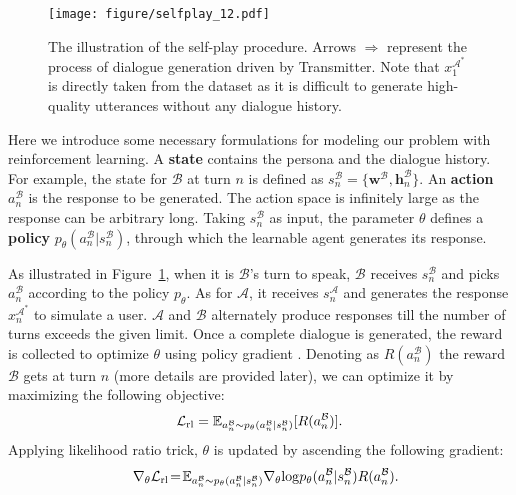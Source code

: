 \documentclass[11pt,a4paper]{article}
\begin{document}
\begin{figure}
    \centering
    \texttt{[image: figure/selfplay\_12.pdf]}
    \caption{The illustration of the self-play procedure. Arrows $\Rightarrow$ represent the process of dialogue generation driven by Transmitter. Note that $x_1^{\mathcal{A}^*}$ is directly taken from the dataset as it is difficult to generate high-quality utterances without any dialogue history.}
    \label{fig:self_play}
\end{figure}

Here we introduce some necessary formulations for modeling our problem with reinforcement learning. 
A \textbf{state} contains the persona and the dialogue history. For example, the state for $\mathcal{B}$ at turn $n$ is defined as $s^{\mathcal{B}}_n=\{\mathbf{w}^{\mathcal{B}},\mathbf{h}^{\mathcal{B}}_n\}$. 
An \textbf{action} $a^\mathcal{B}_n$ is the response to be generated. The action space is infinitely large as the response can be arbitrary long. Taking $s^\mathcal{B}_n$ as input, the parameter $\theta$ defines a \textbf{policy} $p_{\theta}(a^\mathcal{B}_n|s^\mathcal{B}_n)$, through which the learnable agent generates its response.

As illustrated in Figure~\ref{fig:self_play}, when it is $\mathcal{B}$'s turn to speak, $\mathcal{B}$ receives $s^{\mathcal{B}}_n$ and picks $a^\mathcal{B}_n$ according to the policy $p_{\theta}$. As for $\mathcal{A}$, it receives $s^{\mathcal{A}}_n$ and generates the response $x^{\mathcal{A}^*}_{n}$ to simulate a user.
$\mathcal{A}$ and $\mathcal{B}$ alternately produce responses till the number of turns exceeds the given limit. Once a complete dialogue is generated, the reward is collected to optimize $\theta$ using policy gradient \cite{sutton2000policy}. Denoting as $R(a^\mathcal{B}_n)$ the reward $\mathcal{B}$ gets at turn $n$ (more details are provided later), we can optimize it by maximizing the following objective:
\begin{equation}\label{eq:l_rl}
    \mathcal{L}_{\rm{rl}} = \mathbb{E}_{a^\mathcal{B}_n{\sim}p_{\theta}(a^\mathcal{B}_n|s^\mathcal{B}_n)}[R(a^\mathcal{B}_n)].
\end{equation}
Applying likelihood ratio trick, $\theta$ is updated by ascending the following gradient:
\begin{equation}\label{eq:gradient_rl}
   \!{\nabla}_{\theta}{\mathcal{L}}_{\rm{rl}}\!=\!\mathbb{E}_{a^\mathcal{B}_n{\sim}p_{\theta}(a^\mathcal{B}_n|s^\mathcal{B}_n)}{\nabla}_{\theta}\!\log\!p_{\theta}(a^\mathcal{B}_n|s^\mathcal{B}_n)R(a^\mathcal{B}_n).\!\! \!\!\!\!
\end{equation}
\end{document}
